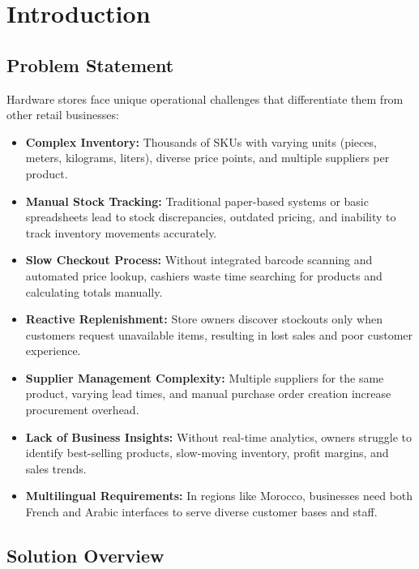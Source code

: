 \section{Introduction}

\subsection{Problem Statement}

Hardware stores face unique operational challenges that differentiate them from other retail businesses:

\begin{itemize}[leftmargin=*]
    \item \textbf{Complex Inventory:} Thousands of SKUs with varying units (pieces, meters, kilograms, liters), diverse price points, and multiple suppliers per product.
    
    \item \textbf{Manual Stock Tracking:} Traditional paper-based systems or basic spreadsheets lead to stock discrepancies, outdated pricing, and inability to track inventory movements accurately.
    
    \item \textbf{Slow Checkout Process:} Without integrated barcode scanning and automated price lookup, cashiers waste time searching for products and calculating totals manually.
    
    \item \textbf{Reactive Replenishment:} Store owners discover stockouts only when customers request unavailable items, resulting in lost sales and poor customer experience.
    
    \item \textbf{Supplier Management Complexity:} Multiple suppliers for the same product, varying lead times, and manual purchase order creation increase procurement overhead.
    
    \item \textbf{Lack of Business Insights:} Without real-time analytics, owners struggle to identify best-selling products, slow-moving inventory, profit margins, and sales trends.
    
    \item \textbf{Multilingual Requirements:} In regions like Morocco, businesses need both French and Arabic interfaces to serve diverse customer bases and staff.
\end{itemize}

\subsection{Solution Overview}

